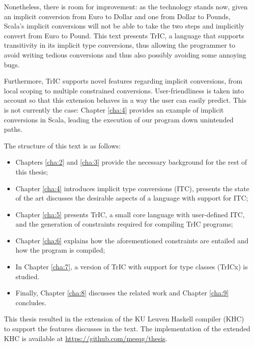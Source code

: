 Nonetheless, there is room for improvement: as the technology stands now, given an implicit conversion from Euro to Dollar and one from Dollar to Pounds, Scala's implicit conversions will not be able to take the two steps and implicitly convert from Euro to Pound. This text presents TrIC, a language that supports transitivity in its implicit type conversions, thus allowing the programmer to avoid writing tedious conversions and thus also possibly avoiding some annoying bugs.

Furthermore, TrIC supports novel features regarding implicit conversions, from local scoping to multiple constrained conversions. User-friendliness is taken into account so that this extension behaves in a way the user can easily predict. This is not currently the case: Chapter \ref{cha:4} provides an example of implicit conversions in Scala, leading the execution of our program down unintended paths.

The structure of this text is as follows:
\begin{itemize}
\item Chapters \ref{cha:2} and \ref{cha:3} provide the necessary background for the rest of this thesis;
\item Chapter \ref{cha:4} introduces implicit type conversions (ITC), presents the state of the art discusses the desirable aspects of a language with support for ITC;
\item Chapter \ref{cha:5} presents TrIC, a small core language with user-defined ITC, and the generation of constraints required for compiling TrIC programs;
\item Chapter \ref{cha:6} explains how the aforementioned constraints are entailed and how the program is compiled;
\item In Chapter \ref{cha:7}, a version of TrIC with support for type classes (TrICx) is studied.
\item Finally, Chapter \ref{cha:8} discusses the related work and Chapter \ref{cha:9} concludes.
\end{itemize}

This thesis resulted in the extension of the KU Leuven Haskell compiler (KHC) to support the features discusses in the text. The implementation of the extended KHC is available at \href{https://github.com/mesqg/thesis}{https://github.com/mesqg/thesis}. 


